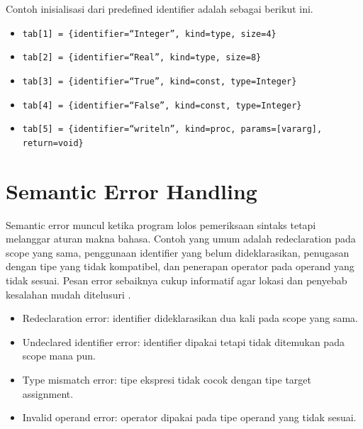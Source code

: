 Contoh inisialisasi dari predefined identifier adalah sebagai berikut ini.
\begin{itemize}
    \item \texttt{tab[1] = \{identifier=``Integer'', kind=type, size=4\}}
    \item \texttt{tab[2] = \{identifier=``Real'', kind=type, size=8\}}
    \item \texttt{tab[3] = \{identifier=``True'', kind=const, type=Integer\}}
    \item \texttt{tab[4] = \{identifier=``False'', kind=const, type=Integer\}}
    \item \texttt{tab[5] = \{identifier=``writeln'', kind=proc, params=[vararg], return=void\}}
\end{itemize}


\section{Semantic Error Handling}
Semantic error muncul ketika program lolos pemeriksaan sintaks tetapi melanggar aturan makna bahasa. Contoh yang umum adalah redeclaration pada scope yang sama, penggunaan identifier yang belum dideklarasikan, penugasan dengan tipe yang tidak kompatibel, dan penerapan operator pada operand yang tidak sesuai. Pesan error sebaiknya cukup informatif agar lokasi dan penyebab kesalahan mudah ditelusuri \cite{louden1997compiler}.

\begin{itemize}
    \item Redeclaration error: identifier dideklarasikan dua kali pada scope yang sama.
    \item Undeclared identifier error: identifier dipakai tetapi tidak ditemukan pada scope mana pun.
    \item Type mismatch error: tipe ekspresi tidak cocok dengan tipe target assignment.
    \item Invalid operand error: operator dipakai pada tipe operand yang tidak sesuai.
\end{itemize}
